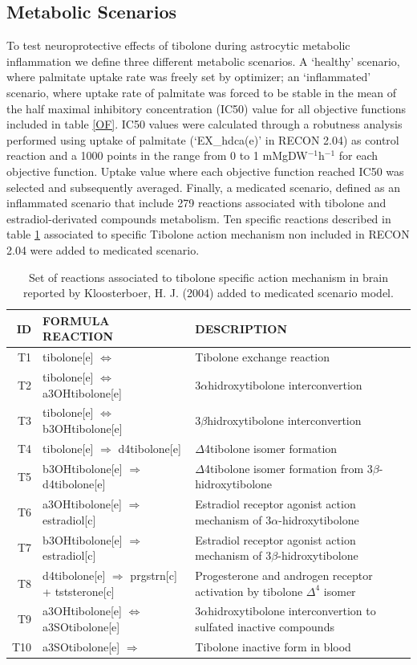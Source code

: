 \subsection*{Metabolic Scenarios}
To test neuroprotective effects of tibolone during astrocytic metabolic inflammation we define three different metabolic scenarios. A `healthy' scenario, where palmitate uptake rate was freely set by optimizer; an `inflammated' scenario, where uptake rate of palmitate was forced to be stable in the mean of the half maximal inhibitory concentration (IC50) value for all objective functions included in table \ref{OF}. IC50 values were calculated through a robutness analysis performed using uptake of palmitate (`EX\_hdca(e)' in RECON 2.04) as control reaction and a 1000 points in the range from 0 to 1 mMgDW$^{-1}$h$^{-1}$ for each objective function. Uptake value where each objective function reached IC50 was selected and subsequently averaged. Finally, a medicated scenario, defined as an inflammated scenario that include 279 reactions associated with tibolone and estradiol-derivated compounds metabolism. Ten specific reactions described in table \ref{Tibolone} associated to specific Tibolone action mechanism non included in RECON 2.04 were added to medicated scenario.
\begin{table}[h]
\caption{Set of reactions associated to tibolone specific action mechanism in brain reported by Kloosterboer, H. J. (2004) added to medicated scenario model.}
\label{Tibolone}
\begin{center}
\begin{tabular}{rlm{7cm}}
\hline
ID & FORMULA REACTION & DESCRIPTION \\
\hline
\hline
T1 & tibolone[e] $\Leftrightarrow$ & Tibolone exchange reaction\\
T2 & tibolone[e] $\Leftrightarrow$ a3OHtibolone[e] & 3$\alpha$hidroxytibolone interconvertion\\
T3 & tibolone[e] $\Leftrightarrow$ b3OHtibolone[e] & 3$\beta$hidroxytibolone interconvertion \\
T4 & tibolone[e] $\Rightarrow$ d4tibolone[e] & $\Delta$4tibolone isomer formation \\
T5 & b3OHtibolone[e] $\Rightarrow$ d4tibolone[e] &  $\Delta$4tibolone isomer formation from 3$\beta$-hidroxytibolone \\
T6 & a3OHtibolone[e] $\Rightarrow$ estradiol[c] & Estradiol receptor agonist action mechanism of 3$\alpha$-hidroxytibolone\\
T7 & b3OHtibolone[e] $\Rightarrow$ estradiol[c] & Estradiol receptor agonist action mechanism of 3$\beta$-hidroxytibolone\\
T8 & d4tibolone[e] $\Rightarrow$ prgstrn[c] + tststerone[c] & Progesterone and androgen receptor activation by tibolone $\Delta^4$ isomer\\
T9 & a3OHtibolone[e] $\Leftrightarrow$ a3SOtibolone[e] & 3$\alpha$hidroxytibolone interconvertion to sulfated inactive compounds \\
T10 & a3SOtibolone[e] $\Rightarrow$ & Tibolone inactive form in blood \\ 
\hline
\end{tabular}
\end{center}
\end{table} 

